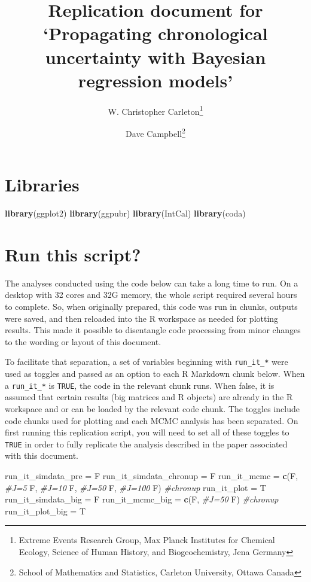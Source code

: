 \documentclass[]{article}
\title{Replication document for `Propagating chronological uncertainty with
Bayesian regression models'}
\author{W. Christopher Carleton\footnote{Extreme Events Research Group, Max
  Planck Institutes for Chemical Ecology, Science of Human History, and
  Biogeochemistry, Jena Germany} \and Dave Campbell\footnote{School of Mathematics and Statistics, Carleton
  University, Ottawa Canada}}
\date{}
\newenvironment{Shaded}{\begin{snugshade}}{\end{snugshade}}
\newcommand{\KeywordTok}[1]{\textcolor[rgb]{0.13,0.29,0.53}{\textbf{#1}}}
\newcommand{\StringTok}[1]{\textcolor[rgb]{0.31,0.60,0.02}{#1}}
\newcommand{\CommentTok}[1]{\textcolor[rgb]{0.56,0.35,0.01}{\textit{#1}}}
\newcommand{\NormalTok}[1]{#1}
\begin{document}
\maketitle

\section{Libraries}\label{libraries}

\begin{Shaded}
\begin{Highlighting}[]
\KeywordTok{library}\NormalTok{(ggplot2)}
\KeywordTok{library}\NormalTok{(ggpubr)}
\KeywordTok{library}\NormalTok{(IntCal)}
\KeywordTok{library}\NormalTok{(coda)}
\end{Highlighting}
\end{Shaded}

\section{Run this script?}\label{run-this-script}

The analyses conducted using the code below can take a long time to run.
On a desktop with 32 cores and 32G memory, the whole script required
several hours to complete. So, when originally prepared, this code was
run in chunks, outputs were saved, and then reloaded into the R
workspace as needed for plotting results. This made it possible to
disentangle code processing from minor changes to the wording or layout
of this document.

To facilitate that separation, a set of variables beginning with
\texttt{run\_it\_*} were used as toggles and passed as an option to each
R Markdown chunk below. When a \texttt{run\_it\_*} is \texttt{TRUE}, the
code in the relevant chunk runs. When false, it is assumed that certain
results (big matrices and R objects) are already in the R workspace and
or can be loaded by the relevant code chunk. The toggles include code
chunks used for plotting and each MCMC analysis has been separated. On
first running this replication script, you will need to set all of these
toggles to \texttt{TRUE} in order to fully replicate the analysis
described in the paper associated with this document.

\begin{Shaded}
\begin{Highlighting}[]
\NormalTok{run_it_simdata_pre =}\StringTok{ }\NormalTok{F}
\NormalTok{run_it_simdata_chronup =}\StringTok{ }\NormalTok{F}
\NormalTok{run_it_mcmc =}\StringTok{ }\KeywordTok{c}\NormalTok{(F,  }\CommentTok{#J=5}
\NormalTok{                F,  }\CommentTok{#J=10}
\NormalTok{                F,  }\CommentTok{#J=50}
\NormalTok{                F,  }\CommentTok{#J=100}
\NormalTok{                F)  }\CommentTok{#chronup}
\NormalTok{run_it_plot =}\StringTok{ }\NormalTok{T}
\NormalTok{run_it_simdata_big =}\StringTok{ }\NormalTok{F}
\NormalTok{run_it_mcmc_big =}\StringTok{ }\KeywordTok{c}\NormalTok{(F, }\CommentTok{#J=50}
\NormalTok{                    F) }\CommentTok{#chronup}
\NormalTok{run_it_plot_big =}\StringTok{ }\NormalTok{T}
\end{Highlighting}
\end{Shaded}
\end{document}

